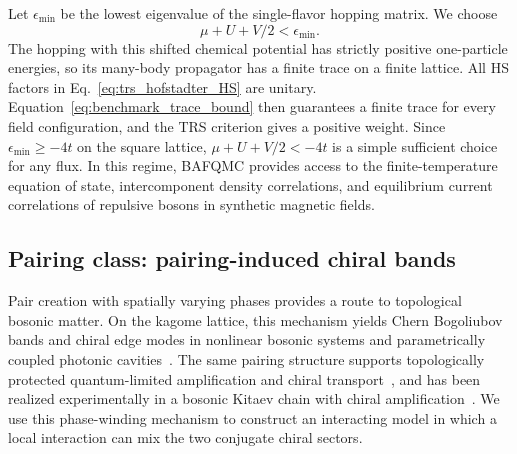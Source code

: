 Let $\epsilon_{\min}$ be the lowest eigenvalue of the single-flavor hopping matrix. We choose
\begin{equation}
    \mu+U+V/2<\epsilon_{\min}.
    \label{eq:trs_hofstadter_trace_condition}
\end{equation}
The hopping with this shifted chemical potential has strictly positive one-particle energies, so its many-body propagator has a finite trace on a finite lattice. All HS factors in Eq.~\eqref{eq:trs_hofstadter_HS} are unitary. Equation~\eqref{eq:benchmark_trace_bound} then guarantees a finite trace for every field configuration, and the TRS criterion gives a positive weight. Since $\epsilon_{\min}\ge-4t$ on the square lattice, $\mu+U+V/2<-4t$ is a simple sufficient choice for any flux. In this regime, BAFQMC provides access to the finite-temperature equation of state, intercomponent density correlations, and equilibrium current correlations of repulsive bosons in synthetic magnetic fields.

\subsection{Pairing class: pairing-induced chiral bands}

Pair creation with spatially varying phases provides a route to topological bosonic matter. On the kagome lattice, this mechanism yields Chern Bogoliubov bands and chiral edge modes in nonlinear bosonic systems and parametrically coupled photonic cavities~\cite{peanoHoudeBrendel2016squeezing,bardynKarzigRefaelLiew2016bogoliubov}. The same pairing structure supports topologically protected quantum-limited amplification and chiral transport~\cite{peanoHoudeMarquardt2016topological}, and has been realized experimentally in a bosonic Kitaev chain with chiral amplification~\cite{slimWanjuraBrunelli2024bosonKitaev}. We use this phase-winding mechanism to construct an interacting model in which a local interaction can mix the two conjugate chiral sectors.

